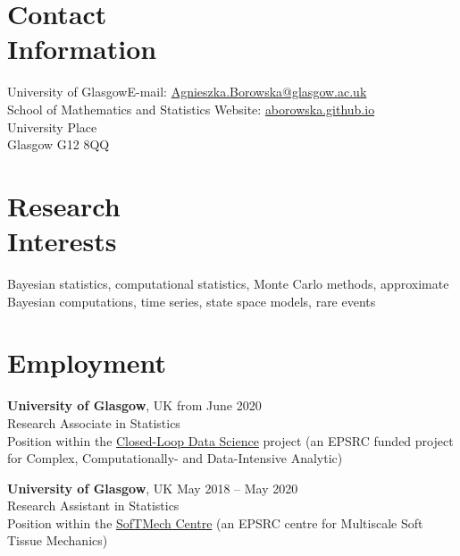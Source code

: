 \documentclass[margin,line]{resume}
\begin{document}
\begin{resume}
    \section{\mysidestyle Contact\\Information}
    University of Glasgow\hfill  E-mail: \url{Agnieszka.Borowska@glasgow.ac.uk} \\
    School of Mathematics and Statistics \hfill Website: \url{aborowska.github.io}\\ \vspace{0mm}%
    University Place \\
    Glasgow G12 8QQ\\ \vspace{-4.6mm}%
    \section{\mysidestyle Research\\Interests}
    
    Bayesian statistics, computational statistics, Monte Carlo methods, approximate Bayesian computations, time series, state space models, rare events
\vspace{-1mm}   
 
    \section{\mysidestyle Employment }
    \textbf{University of Glasgow},  UK \hfill from June 2020\\
	Research Associate in Statistics\\ 
    Position within the \href{https://www.gla.ac.uk/schools/computing/research/researchsections/ida-section/closedloop/}{Closed-Loop Data Science} project (an EPSRC funded project for Complex, Computationally- and Data-Intensive Analytic)
    \vspace{-2mm}

    \textbf{University of Glasgow},  UK \hfill  May 2018 -- May 2020\\
	Research Assistant in Statistics\\ 
    Position within the \href{http://softmech.org/}{SofTMech Centre} (an EPSRC centre for Multiscale Soft Tissue Mechanics)
    \vspace{-2mm}
        

\end{resume}
\end{document}
